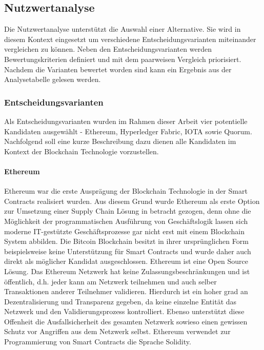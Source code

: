 \subsection{Nutzwertanalyse}
Die Nutzwertanalyse unterstützt die Auswahl einer Alternative. Sie wird in diesem Kontext eingesetzt um verschiedene Entscheidungsvarianten miteinander vergleichen zu können. Neben den Entscheidungsvarianten werden Bewertungskriterien definiert und mit dem paarweisen Vergleich priorisiert. Nachdem die Varianten bewertet worden sind kann ein Ergebnis aus der Analysetabelle gelesen werden.

\subsubsection{Entscheidungsvarianten}
Als Entscheidungsvarianten wurden im Rahmen dieser Arbeit vier potentielle Kandidaten ausgewählt - Ethereum, Hyperledger Fabric, IOTA sowie Quorum. Nachfolgend soll eine kurze Beschreibung dazu dienen alle Kandidaten im Kontext der Blockchain Technologie vorzustellen.

\paragraph{Ethereum}
Ethereum war die erste Ausprägung der Blockchain Technologie in der Smart Contracts realisiert wurden. Aus diesem Grund wurde Ethereum als erste Option zur Umsetzung einer Supply Chain Lösung in betracht gezogen, denn ohne die Möglichkeit der programmatischen Ausführung von Geschäftslogik lassen sich moderne IT-gestützte Geschäftsprozesse gar nicht erst mit einem Blockchain System abbilden. Die Bitcoin Blockchain besitzt in ihrer ursprünglichen Form beispielsweise keine Unterstützung für Smart Contracts und wurde daher auch direkt als möglicher Kandidat ausgeschlossen. Ethereum ist eine Open Source Lösung. Das Ethereum Netzwerk hat keine Zulassungsbeschränkungen und ist öffentlich, d.h. jeder kann am Netzwerk teilnehmen und auch selber Transaktionen anderer Teilnehmer validieren. Hierdurch ist ein hoher grad an Dezentralisierung und Transparenz gegeben, da keine einzelne Entität das Netzwerk und den Validierungsprozess kontrolliert. Ebenso unterstützt diese Offenheit die Ausfallsicherheit des gesamten Netzwerk sowieso einen gewissen Schutz vor Angriffen aus dem Netzwerk selbst. Ethereum verwendet zur Programmierung von Smart Contracts die Sprache Solidity.

